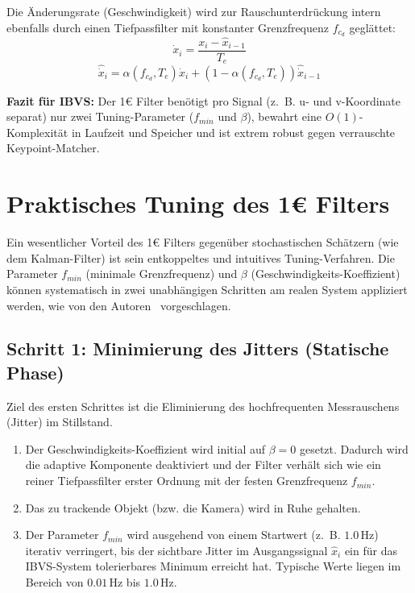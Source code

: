 \documentclass{article}
\begin{document}
Die Änderungsrate (Geschwindigkeit) wird zur Rauschunterdrückung intern ebenfalls durch einen Tiefpassfilter mit konstanter Grenzfrequenz $f_{c_d}$ geglättet:
\begin{equation}
    \dot{x}_i = \frac{x_i - \hat{x}_{i-1}}{T_e}
\end{equation}
\begin{equation}
    \hat{\dot{x}}_i = \alpha(f_{c_d}, T_e) \dot{x}_i + (1 - \alpha(f_{c_d}, T_e)) \hat{\dot{x}}_{i-1}
\end{equation}

\textbf{Fazit für IBVS:} Der 1\euro{} Filter benötigt pro Signal (z.~B. u- und v-Koordinate separat) nur zwei Tuning-Parameter ($f_{min}$ und $\beta$), bewahrt eine $O(1)$-Komplexität in Laufzeit und Speicher und ist extrem robust gegen verrauschte Keypoint-Matcher.





\section{Praktisches Tuning des 1\euro{} Filters}
\label{sec:one_euro_tuning}

Ein wesentlicher Vorteil des 1\euro{} Filters gegenüber stochastischen Schätzern (wie dem Kalman-Filter) ist sein entkoppeltes und intuitives Tuning-Verfahren. Die Parameter $f_{min}$ (minimale Grenzfrequenz) und $\beta$ (Geschwindigkeits-Koeffizient) können systematisch in zwei unabhängigen Schritten am realen System appliziert werden, wie von den Autoren~\cite{casiez20121euro} vorgeschlagen.




\subsection{Schritt 1: Minimierung des Jitters (Statische Phase)}
Ziel des ersten Schrittes ist die Eliminierung des hochfrequenten Messrauschens (Jitter) im Stillstand.
\begin{enumerate}
    \item Der Geschwindigkeits-Koeffizient wird initial auf $\beta = 0$ gesetzt. Dadurch wird die adaptive Komponente deaktiviert und der Filter verhält sich wie ein reiner Tiefpassfilter erster Ordnung mit der festen Grenzfrequenz $f_{min}$.
    \item Das zu trackende Objekt (bzw. die Kamera) wird in Ruhe gehalten.
    \item Der Parameter $f_{min}$ wird ausgehend von einem Startwert (z.~B. $1.0\,\text{Hz}$) iterativ verringert, bis der sichtbare Jitter im Ausgangssignal $\hat{x}_i$ ein für das IBVS-System tolerierbares Minimum erreicht hat. Typische Werte liegen im Bereich von $0.01\,\text{Hz}$ bis $1.0\,\text{Hz}$.
\end{enumerate}
\end{document}
